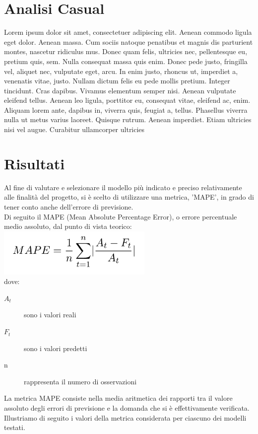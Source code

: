 \documentclass[12pt, a4paper, twocolumn]{article} %
\begin{document}
\section{Analisi Casual}
Lorem ipsum dolor sit amet, consectetuer adipiscing elit. Aenean commodo ligula eget dolor. Aenean massa. Cum sociis natoque penatibus et magnis dis parturient montes, nascetur ridiculus mus. Donec quam felis, ultricies nec, pellentesque eu, pretium quis, sem. Nulla consequat massa quis enim. Donec pede justo, fringilla vel, aliquet nec, vulputate eget, arcu. In enim justo, rhoncus ut, imperdiet a, venenatis vitae, justo. Nullam dictum felis eu pede mollis pretium. Integer tincidunt. Cras dapibus. Vivamus elementum semper nisi. Aenean vulputate eleifend tellus. Aenean leo ligula, porttitor eu, consequat vitae, eleifend ac, enim. Aliquam lorem ante, dapibus in, viverra quis, feugiat a, tellus. Phasellus viverra nulla ut metus varius laoreet. Quisque rutrum. Aenean imperdiet. Etiam ultricies nisi vel augue. Curabitur ullamcorper ultricies

\section{Risultati}
Al fine di valutare e selezionare il modello più indicato e preciso relativamente alle finalità del progetto, si è scelto di utilizzare una metrica, 'MAPE', in grado di tener conto anche dell'errore di previsione.\\
Di seguito il MAPE (Mean Absolute Percentage Error), o errore percentuale medio assoluto, dal punto di vista teorico:\\
\includegraphics[width=75mm,scale=0.5]{mape.png}
\\
dove:
\begin{description}
	\item[$A_t$] sono i valori reali
	\item[$F_t$] sono i valori predetti
	\item[n] rappresenta il numero di osservazioni
\end{description}

La metrica MAPE consiste nella media aritmetica dei rapporti tra il valore assoluto degli errori di previsione e la domanda che si è effettivamente verificata.\\
Illustriamo di seguito i valori della metrica considerata per ciascuno dei modelli testati.
\end{document}
